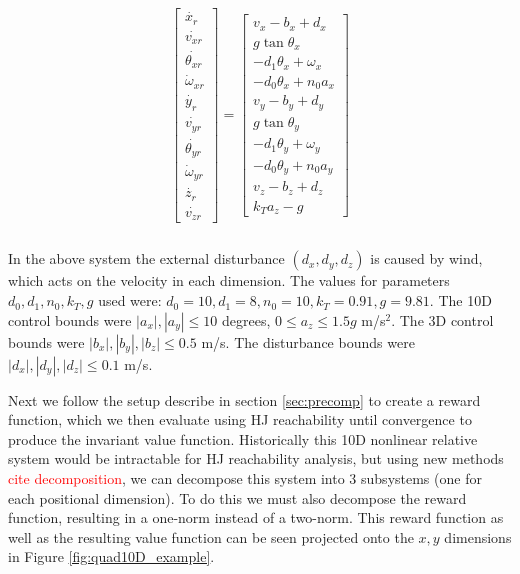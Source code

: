 \begin{equation}
\label{eq:Quad10DRel_dyn}
\begin{aligned}
\begin{array}{c}
\left[
\begin{array}{c}
\dot{x_r}\\
\dot{v_{xr}}\\
\dot{\theta_{xr}}\\
\dot\omega_{xr}\\
\dot{y_r}\\
\dot{v_{yr}}\\
\dot{\theta_{yr}}\\
\dot\omega_{yr}\\
\dot{z_r}\\
\dot{v_{zr}}
\end{array}
\right]
=
\left[
\begin{array}{c}
v_x - b_x + d_x\\
g \tan \theta_x\\
-d_1 \theta_x + \omega_x\\
-d_0 \theta_x + n_0 a_x\\
v_y - b_y + d_y\\
g \tan \theta_y\\
-d_1 \theta_y + \omega_y\\
-d_0 \theta_y + n_0 a_y\\
v_z - b_z + d_z\\
k_T a_z - g
\end{array}
\right]
\end{array}\\
\end{aligned}
\end{equation}

In the above system the external disturbance $(d_x, d_y, d_z)$ is caused by wind, which acts on the velocity in each dimension. The values for parameters $d_0,d_1,n_0,k_T,g$ used were: $d_0=10,d_1=8,n_0=10,k_T=0.91,g=9.81$. The 10D control bounds were $|a_x|,|a_y|\leq10$ degrees, $0\leq a_z\leq 1.5g$ m/s$^{2}$. The 3D control bounds were $|b_x|,|b_y|,|b_z|\leq0.5$ m/s. The disturbance bounds were $|d_x|,|d_y|,|d_z|\leq0.1$ m/s.

Next we follow the setup describe in section \ref{sec:precomp} to create a reward function, which we then evaluate using HJ reachability until convergence to produce the invariant value function. Historically this 10D nonlinear relative system would be intractable for HJ reachability analysis, but using new methods \textcolor{red}{cite decomposition}, we can decompose this system into 3 subsystems (one for each positional dimension). To do this we must also decompose the reward function, resulting in a one-norm instead of a two-norm. This reward function as well as the resulting value function can be seen projected onto the $x,y$ dimensions in Figure \ref{fig:quad10D_example}.

